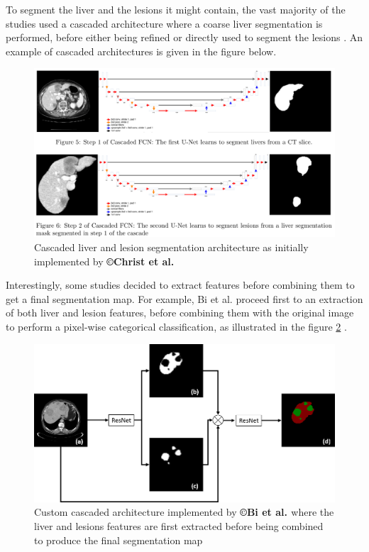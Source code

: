 To segment the liver and the lesions it might contain, the vast majority
of the studies used a cascaded architecture where a coarse liver
segmentation is performed, before either being refined \cite{Yuan2017} or directly used to segment the lesions \cite{Han2017, Li2018, Kaluva2018, Ben-Cohen, Christ2017}. An example of cascaded architectures is
given in the figure below. 
\begin{figure}[th!]
	\centering
	\includegraphics[width=\linewidth]{images/image35}
	\caption{Cascaded liver and lesion segmentation architecture as initially implemented by \textbf{©Christ et al. \cite{Christ2017}}}
	\label{Cascade_Christ}
\end{figure}

Interestingly, some studies decided to extract features before combining
them to get a final segmentation map. For example, Bi et al.
proceed first to an extraction of both liver and lesion features, before
combining them with the original image to perform a pixel-wise
categorical classification, as illustrated in the figure \ref{Bi2017_Fig2} \cite{Bi2017}.

\begin{figure}[th!]
	\centering
	\includegraphics[width=0.7\linewidth]{images/Bi2017_Fig2}
	\caption{Custom cascaded architecture implemented by \textbf{©Bi et al. \cite{Bi2017}} where the liver and lesions features are first extracted before being combined to produce the final segmentation map }
	\label{Bi2017_Fig2}
\end{figure}


